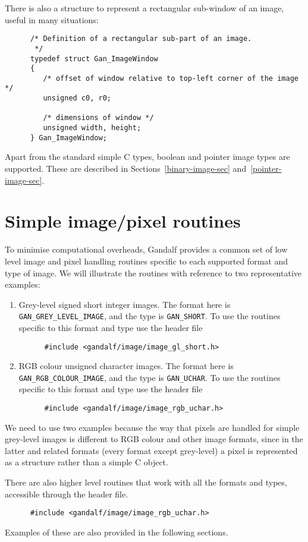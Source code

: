 There is also a structure to represent a rectangular sub-window of an
image, useful in many situations:
\begin{verbatim}
      /* Definition of a rectangular sub-part of an image.
       */
      typedef struct Gan_ImageWindow
      {
         /* offset of window relative to top-left corner of the image */
         unsigned c0, r0;

         /* dimensions of window */
         unsigned width, height;
      } Gan_ImageWindow;
\end{verbatim}

Apart from the standard simple C types, boolean and pointer image types are
supported. These are described in Sections~\ref{binary-image-sec}
and~\ref{pointer-image-sec}.

\section{Simple image/pixel routines} \label{simple-image-sec}
To minimise computational overheads, Gandalf provides a common set
of low level image and pixel handling routines specific to each
supported format and type of image. We will illustrate the routines with
reference to two representative examples:
\begin{enumerate}
  \item Grey-level signed short integer images. The format here is
	{\tt GAN\_GREY\_LEVEL\_IMAGE}, and the type is {\tt GAN\_SHORT}.
	To use the routines specific to this format and type use the
	header file
	\begin{verbatim}
      #include <gandalf/image/image_gl_short.h>
	\end{verbatim}
  \item RGB colour unsigned character images. The format here is
	{\tt GAN\_RGB\_COLOUR\_IMAGE}, and the type is {\tt GAN\_UCHAR}.
	To use the routines specific to this format and type use the
	header file
	\begin{verbatim}
      #include <gandalf/image/image_rgb_uchar.h>
	\end{verbatim}
\end{enumerate}
We need to use two examples because the way that pixels are handled for
simple grey-level images is different to RGB colour and other image formats,
since in the latter and related formats (every format except grey-level)
a pixel is represented as a structure rather than a simple C object.

There are also higher level routines that work with all the formats and
types, accessible through the header file.
\begin{verbatim}
      #include <gandalf/image/image_rgb_uchar.h>
\end{verbatim}
Examples of these are also provided in the following sections.

